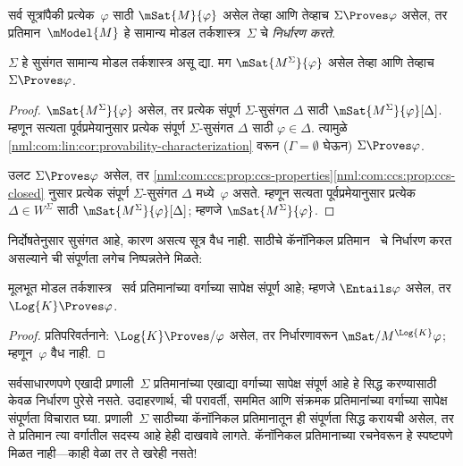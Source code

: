 \begin{defn}
  सर्व सूत्रांपैकी प्रत्येक~$\varphi$ साठी
  $\mSat{M}{\varphi}$ असेल तेव्हा आणि तेव्हाच
  $\Sigma \Proves \varphi$ असेल, तर
  प्रतिमान~$\mModel{M}$ हे सामान्य मोडल
  तर्कशास्त्र~$\Sigma$ चे
  \emph{निर्धारण करते}.
\end{defn}

\begin{thm}[निर्धारण]\label{nml:com:cmk:thm:determination}
   $\Sigma$ हे सुसंगत सामान्य मोडल तर्कशास्त्र असू द्या. मग
   $\mSat{M^\Sigma}{\varphi}$ असेल तेव्हा
   आणि तेव्हाच $\Sigma \Proves \varphi$.
\end{thm}

\begin{proof}
  $\mSat{M^\Sigma}{\varphi}$ असेल, तर प्रत्येक
  संपूर्ण $\Sigma$-सुसंगत $\Delta$ साठी
  $\mSat{M^\Sigma}{\varphi}[\Delta]$.
  म्हणून सत्यता पूर्वप्रमेयानुसार प्रत्येक
  संपूर्ण $\Sigma$-सुसंगत $\Delta$ साठी
  $\varphi \in \Delta$. त्यामुळे
  \ref{nml:com:lin:cor:provability-characterization}
  वरून ($\Gamma = \emptyset$ घेऊन)
  $\Sigma \Proves \varphi$.

  उलट $\Sigma \Proves \varphi$ असेल, तर
  \ref{nml:com:ccs:prop:ccs-properties}\ref{nml:com:ccs:prop:ccs-closed}
  नुसार प्रत्येक संपूर्ण $\Sigma$-सुसंगत
  $\Delta$ मध्ये~$\varphi$ असते. म्हणून
  सत्यता पूर्वप्रमेयानुसार प्रत्येक~$\Delta \in
  W^\Sigma$ साठी
  $\mSat{M^\Sigma}{\varphi}[\Delta]$;
  म्हणजे $\mSat{M^\Sigma}{\varphi}$.
\end{proof}

निर्दोषतेनुसार  सुसंगत आहे, कारण असत्य सूत्र वैध नाही.
 साठीचे कॅनॉनिकल प्रतिमान~
चे निर्धारण करत असल्याने
 ची संपूर्णता लगेच निष्पन्नतेने मिळते:

\begin{cor}\label{nml:com:cmk:cor:Kcomplete}
  मूलभूत मोडल तर्कशास्त्र~
सर्व प्रतिमानांच्या वर्गाच्या सापेक्ष
संपूर्ण आहे; म्हणजे
$\Entails \varphi$ असेल, तर $\Log{K}
\Proves \varphi$.
\end{cor}

\begin{proof}
  प्रतिपरिवर्तनाने: $\Log{K} \Proves/ \varphi$
  असेल, तर निर्धारणावरून
  $\mSat/{M^{\Log{K}}}{\varphi}$;
  म्हणून~$\varphi$ वैध नाही.
\end{proof}

सर्वसाधारणपणे एखादी प्रणाली~$\Sigma$
प्रतिमानांच्या एखाद्या वर्गाच्या सापेक्ष
संपूर्ण आहे हे सिद्ध करण्यासाठी
केवळ निर्धारण पुरेसे नसते. उदाहरणार्थ,
 ची परावर्ती, सममित आणि
संक्रमक प्रतिमानांच्या वर्गाच्या सापेक्ष
संपूर्णता विचारात घ्या. प्रणाली~$\Sigma$
साठीच्या कॅनॉनिकल प्रतिमानातून ही संपूर्णता सिद्ध करायची असेल,
तर ते प्रतिमान त्या वर्गातील सदस्य आहे हेही दाखवावे लागते.
कॅनॉनिकल प्रतिमानाच्या रचनेवरून हे
स्पष्टपणे मिळत नाही---काही वेळा
तर ते खरेही नसते!














